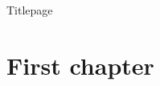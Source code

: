 \documentclass{book}
\begin{document}
\begin{titlepage}
    Titlepage
\end{titlepage}
\tableofcontents

\chapter{First chapter}
\end{document}
